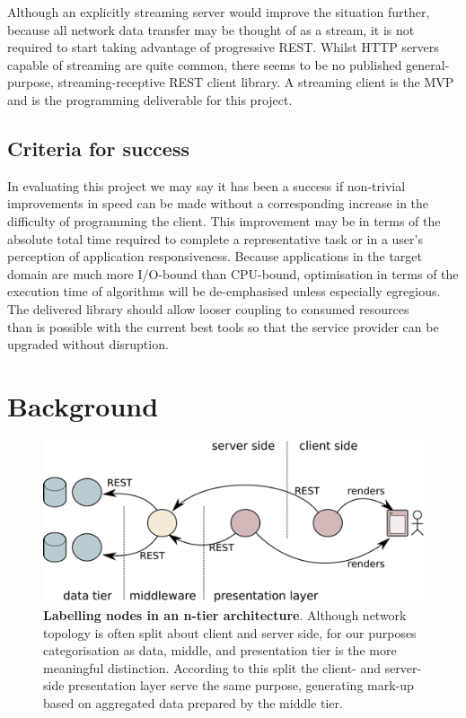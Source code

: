 \documentclass[12pt, ]{article}
\makeatletter
\let\stdsection\section
\renewcommand\section{\newpage\stdsection}
\def\maxwidth{\ifdim\Gin@nat@width>\linewidth\linewidth
\else\Gin@nat@width\fi}
\let\Oldincludegraphics\includegraphics
\renewcommand{\includegraphics}[1]{\Oldincludegraphics[width=\maxwidth]{#1}}
\makeatother
\begin{document}
Although an explicitly streaming server would improve the situation
further, because all network data transfer may be thought of as a
stream, it is not required to start taking advantage of progressive
REST. Whilst HTTP servers capable of streaming are quite common, there
seems to be no published general-purpose, streaming-receptive REST
client library. A streaming client is the MVP and is the programming
deliverable for this project.

\subsection{Criteria for success}\label{criteria-for-success}

In evaluating this project we may say it has been a success if
non-trivial improvements in speed can be made without a corresponding
increase in the difficulty of programming the client. This improvement
may be in terms of the absolute total time required to complete a
representative task or in a user's perception of application
responsiveness. Because applications in the target domain are much more
I/O-bound than CPU-bound, optimisation in terms of the execution time of
algorithms will be de-emphasised unless especially egregious. The
delivered library should allow looser coupling to consumed
resources\\than is possible with the current best tools so that the
service provider can be upgraded without disruption.

\section{Background}\label{background}

\begin{figure}[htbp]
\centering
\includegraphics{images/architecture.png}
\caption{\textbf{Labelling nodes in an n-tier architecture}. Although
network topology is often split about client and server side, for our
purposes categorisation as data, middle, and presentation tier is the
more meaningful distinction. According to this split the client- and
server-side presentation layer serve the same purpose, generating
mark-up based on aggregated data prepared by the middle tier.
\label{architecture}}
\end{figure}
\end{document}
